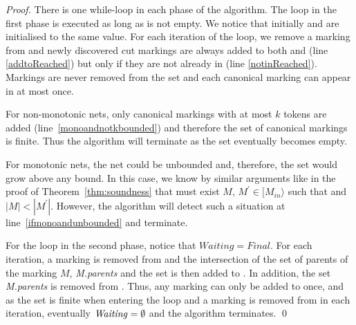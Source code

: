 \begin{proof}%
	 There is one while-loop in each phase of the algorithm. The loop in the first phase is executed as long as  is not empty. 
	We notice that initially  and  are initialised to the same value.
	For each iteration of the loop, we remove a marking from  
        and newly discovered cut markings are always added to both 
         and 
        (line \ref{addtoReached}) but only if they 
        are not already in  (line \ref{notinReached}).
        Markings are never removed from the set  and
        each canonical marking can appear in  at most once.

	For non-monotonic nets, only canonical markings with at most
        $k$ tokens are added (line~\ref{monoandnotkbounded}) 
        and therefore the set of canonical markings is finite. 
        Thus the algorithm will terminate as the set  
        eventually becomes empty.

        For monotonic nets, the net
        could be unbounded and, therefore, the set  would grow above any
        bound. In this case, we know by similar arguments 
        like in the proof of Theorem~\ref{thm:soundness} that must 
        exist $M$, $M^\prime \in [ M_{in}\rangle$ such that 
         and $|M| < |M^\prime|$. However,
        the algorithm will detect such a situation 
        at line~\ref{ifmonoandunbounded} and terminate.

	For the loop in the second phase, 
        notice that $\mathit{Waiting} = \mathit{Final}$. 
	For each iteration, a marking is removed from  and 
        the intersection of the set of parents of the marking $M$, 
        \emph{M.parents} and the set  is then added to 
        . In addition, the set \emph{M.parents} is removed 
        from . Thus, any marking can only be added to 
         once, and as the set 
        is finite when entering the loop and a marking is removed from 
         in each iteration, 
        eventually ${\mathit{Waiting}} = \emptyset$ and the algorithm terminates.	
\qed
\end{proof}



